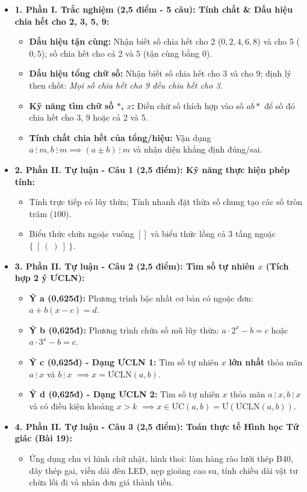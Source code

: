 \documentclass[11pt,a4paper]{article}
\begin{document}
\begin{itemize}[leftmargin=1.3em, itemsep=0.8pt]
  \item \textbf{1. Phần I. Trắc nghiệm (2,5 điểm - 5 câu): Tính chất \& Dấu hiệu chia hết cho 2, 3, 5, 9:}
  \begin{itemize}[itemsep=0.3pt]
    \item \textbf{Dấu hiệu tận cùng:} Nhận biết số chia hết cho 2 ($0, 2, 4, 6, 8$) và cho 5 ($0, 5$); số chia hết cho cả 2 và 5 (tận cùng bằng $0$).
    \item \textbf{Dấu hiệu tổng chữ số:} Nhận biết số chia hết cho 3 và cho 9; định lý then chốt: \textit{Mọi số chia hết cho 9 đều chia hết cho 3}.
    \item \textbf{Kỹ năng tìm chữ số $*$, $x$:} Điền chữ số thích hợp vào số $\overline{ab*}$ để số đó chia hết cho 3, 9 hoặc cả 2 và 5.
    \item \textbf{Tính chất chia hết của tổng/hiệu:} Vận dụng $a \ \vdots \ m, b \ \vdots \ m \implies (a \pm b) \ \vdots \ m$ và nhận diện khẳng định đúng/sai.
  \end{itemize}

  \item \textbf{2. Phần II. Tự luận - Câu 1 (2,5 điểm): Kỹ năng thực hiện phép tính:}
  \begin{itemize}[itemsep=0.3pt]
    \item Tính trực tiếp có lũy thừa; Tính nhanh đặt thừa số chung tạo các số tròn trăm ($100$).
    \item Biểu thức chứa ngoặc vuông $[ ]$ và biểu thức lồng cả 3 tầng ngoặc $\{ \ [ \ ( \ ) \ ] \ \}$.
  \end{itemize}

  \item \textbf{3. Phần II. Tự luận - Câu 2 (2,5 điểm): Tìm số tự nhiên $x$ (Tích hợp 2 ý ƯCLN):}
  \begin{itemize}[itemsep=0.3pt]
    \item \textbf{Ý a (0,625đ):} Phương trình bậc nhất cơ bản có ngoặc đơn: $a + b(x - c) = d$.
    \item \textbf{Ý b (0,625đ):} Phương trình chứa số mũ lũy thừa: $a \cdot 2^x - b = c$ hoặc $a \cdot 3^x - b = c$.
    \item \textbf{Ý c (0,625đ) - Dạng ƯCLN 1:} Tìm số tự nhiên $x$ \textbf{lớn nhất} thỏa mãn $a \ \vdots \ x$ và $b \ \vdots \ x$ $\implies x = \text{ƯCLN}(a, b)$.
    \item \textbf{Ý d (0,625đ) - Dạng ƯCLN 2:} Tìm số tự nhiên $x$ thỏa mãn $a \ \vdots \ x, b \ \vdots \ x$ và có điều kiện khoảng $x > k$ $\implies x \in \text{ƯC}(a, b) = \text{Ư}(\text{ƯCLN}(a, b))$.
  \end{itemize}

  \item \textbf{4. Phần II. Tự luận - Câu 3 (2,5 điểm): Toán thực tế Hình học Tứ giác (Bài 19):}
  \begin{itemize}[itemsep=0.3pt]
    \item Ứng dụng chu vi hình chữ nhật, hình thoi: làm hàng rào lưới thép B40, dây thép gai, viền dải đèn LED, nẹp gioăng cao su, tính chiều dài vật tư chừa lối đi và nhân đơn giá thành tiền.
  \end{itemize}
\end{itemize}
\end{document}

